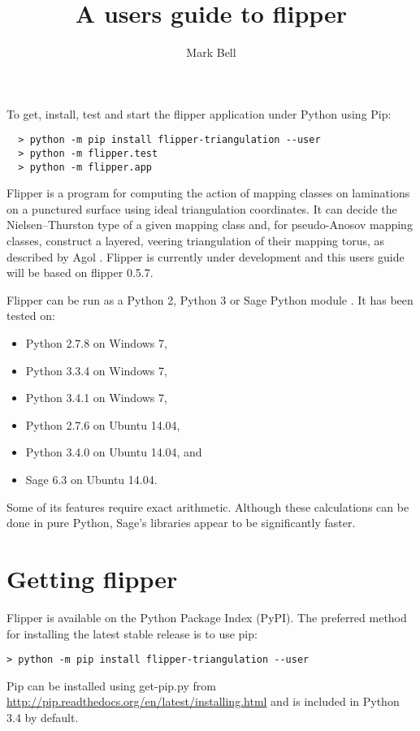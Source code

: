 \documentclass[a4paper]{article}
\title{A users guide to flipper}
\author{Mark Bell}
\begin{document}
\maketitle

\begin{center}
\begin{minipage}{0.8\linewidth}
\begin{framed}
  To get, install, test and start the flipper application under Python using Pip:
  \begin{lstlisting}
  > python -m pip install flipper-triangulation --user
  > python -m flipper.test
  > python -m flipper.app
  \end{lstlisting}
\end{framed}
\end{minipage}
\end{center}

Flipper is a program for computing the action of mapping classes on laminations on a punctured surface using ideal triangulation coordinates. It can decide the Nielsen--Thurston type of a given mapping class and, for pseudo-Anosov mapping classes, construct a layered, veering triangulation of their mapping torus, as described by Agol \cite{Agol}. Flipper is currently under development and this users guide will be based on flipper 0.5.7.


Flipper can be run as a Python 2, Python 3 or Sage Python module \cite{sage}. It has been tested on:
\begin{itemize}
 \item Python 2.7.8 on Windows 7,
 \item Python 3.3.4 on Windows 7,
 \item Python 3.4.1 on Windows 7,
 \item Python 2.7.6 on Ubuntu 14.04,
 \item Python 3.4.0 on Ubuntu 14.04, and
 \item Sage 6.3 on Ubuntu 14.04.
\end{itemize}
Some of its features require exact arithmetic. Although these calculations can be done in pure Python, Sage's libraries appear to be significantly faster.

\section{Getting flipper}

Flipper is available on the Python Package Index (PyPI). The preferred method for installing the latest stable release is to use pip:
\begin{lstlisting}
> python -m pip install flipper-triangulation --user
\end{lstlisting}
Pip can be installed using get-pip.py from \url{http://pip.readthedocs.org/en/latest/installing.html} and is included in Python 3.4 by default.
\end{document}
